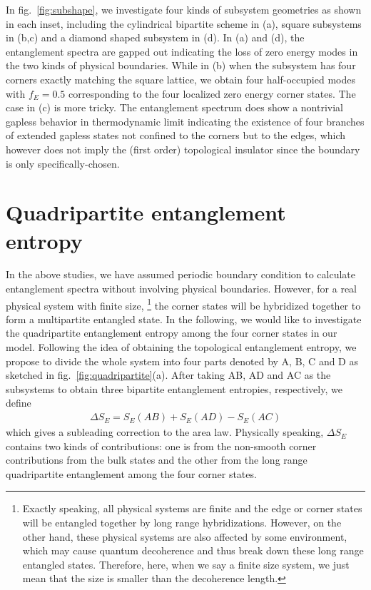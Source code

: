 \documentclass[doublecol]{epl2} %
\begin{document}
In fig.~\ref{fig:subshape}, we investigate four kinds of subsystem geometries as shown in each inset, including the cylindrical bipartite scheme in (a), square subsystems in (b,c) and a diamond shaped subsystem in (d). In (a) and (d), the entanglement spectra are gapped out indicating the loss of zero energy modes in the two kinds of physical boundaries. While in (b) when the subsystem has four corners exactly matching the square lattice, we obtain four half-occupied modes with $f_{E}=0.5$ corresponding to the four localized zero energy corner states. The case in (c) is more tricky. The entanglement spectrum does show a nontrivial gapless behavior in thermodynamic limit indicating the existence of four branches of extended gapless states not confined to the corners but to the edges, which however does not imply the (first order) topological insulator since the boundary is only specifically-chosen. 

\section{Quadripartite entanglement entropy}

In the above studies, we have assumed periodic boundary condition to calculate entanglement spectra without involving physical boundaries. However, for a real physical system with finite size, \footnote{Exactly speaking, all physical systems are finite and the edge or corner states will be entangled together by long range hybridizations. However, on the other hand, these physical systems are also affected by some environment, which may cause quantum decoherence and thus break down these long range entangled states. Therefore, here, when we say a finite size system, we just mean that the size is smaller than the decoherence length.} the corner states will be hybridized together to form a multipartite entangled state. In the following, we would like to investigate the quadripartite entanglement entropy among the four corner states in our model. Following the idea of obtaining the topological entanglement entropy, \cite{Kitaev_PRL_2006, Levin_PRL_2006} we propose to divide the whole system into four parts denoted by A, B, C and D as sketched in fig.~\ref{fig:quadripartite}(a). After taking AB, AD and AC as the subsystems to obtain three bipartite entanglement entropies, respectively, we define
\begin{eqnarray}
\Delta S_E=S_E(AB)+S_E(AD)-S_E(AC)
\end{eqnarray}
which gives a subleading correction to the area law. Physically speaking, $\Delta S_E$ contains two kinds of contributions: one is from the non-smooth corner contributions from the bulk states and the other from the long range quadripartite entanglement among the four corner states.
\end{document}

